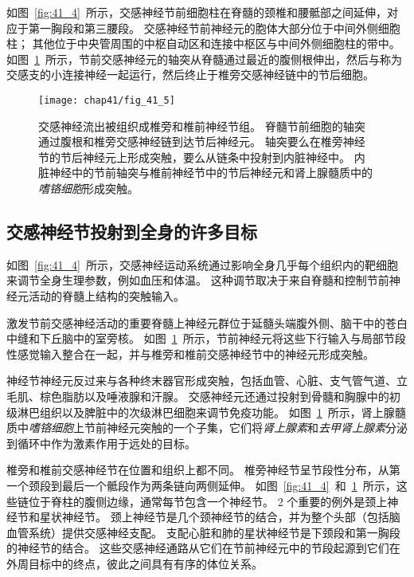 如图~\ref{fig:41_4}~所示，交感神经节前细胞柱在脊髓的颈椎和腰骶部之间延伸，对应于第一胸段和第三腰段。
交感神经节前神经元的胞体大部分位于中间外侧细胞柱；
其他位于中央管周围的中枢自动区和连接中枢区与中间外侧细胞柱的带中。
如图~\ref{fig:41_5}~所示，节前交感神经元的轴突从脊髓通过最近的腹侧根伸出，然后与称为交感支的小连接神经一起运行，然后终止于椎旁交感神经链中的节后细胞。


\begin{figure}[htbp]
	\centering
	\texttt{[image: chap41/fig\_41\_5]}
	\caption{交感神经流出被组织成椎旁和椎前神经节组。
		脊髓节前细胞的轴突通过腹根和椎旁交感神经链到达节后神经元。
		轴突要么在椎旁神经节的节后神经元上形成突触，要么从链条中投射到内脏神经中。
		内脏神经中的节前轴突与椎前神经节中的节后神经元和肾上腺髓质中的\textit{嗜铬细胞}形成突触。}
	\label{fig:41_5}
\end{figure}


\subsection{交感神经节投射到全身的许多目标}

如图~\ref{fig:41_4}~所示，交感神经运动系统通过影响全身几乎每个组织内的靶细胞来调节全身生理参数，例如血压和体温。
这种调节取决于来自脊髓和控制节前神经元活动的脊髓上结构的突触输入。


激发节前交感神经活动的重要脊髓上神经元群位于延髓头端腹外侧、脑干中的苍白中缝和下丘脑中的室旁核。
如图~\ref{fig:41_5}~所示，节前神经元将这些下行输入与局部节段性感觉输入整合在一起，并与椎旁和椎前交感神经节中的神经元形成突触。


神经节神经元反过来与各种终末器官形成突触，包括血管、心脏、支气管气道、立毛肌、棕色脂肪以及唾液腺和汗腺。
交感神经元还通过投射到骨髓和胸腺中的初级淋巴组织以及脾脏中的次级淋巴细胞来调节免疫功能。
如图~\ref{fig:41_5}~所示，肾上腺髓质中\textit{嗜铬细胞}上节前神经元突触的一个子集，它们将\textit{肾上腺素}和\textit{去甲肾上腺素}分泌到循环中作为激素作用于远处的目标。


椎旁和椎前交感神经节在位置和组织上都不同。
椎旁神经节呈节段性分布，从第一个颈段到最后一个骶段作为两条链向两侧延伸。
如图~\ref{fig:41_4}~和~\ref{fig:41_5}~所示，这些链位于脊柱的腹侧边缘，通常每节包含一个神经节。
2 个重要的例外是颈上神经节和星状神经节。
颈上神经节是几个颈神经节的结合，并为整个头部（包括脑血管系统）提供交感神经支配。
支配心脏和肺的星状神经节是下颈段和第一胸段的神经节的结合。
这些交感神经通路从它们在节前神经元中的节段起源到它们在外周目标中的终点，彼此之间具有有序的体位关系。


